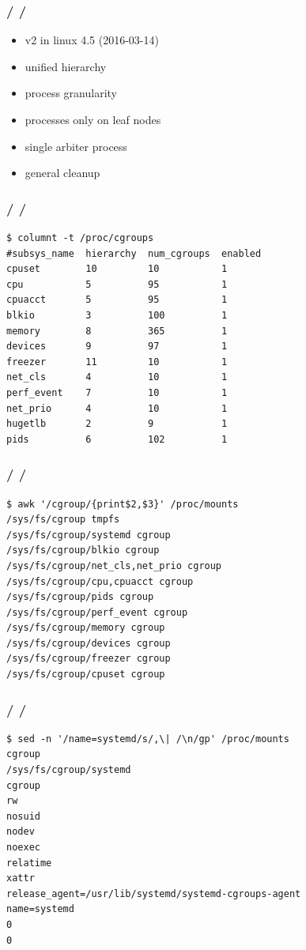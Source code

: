 \documentclass{beamer}
\newcommand{\autotitle}
{\frametitle{
    \secname
    \ifx\insertsubsection\empty
    \else
        /\subsecname
        \ifx\insertsubsubsection\empty\else/\subsubsecname\fi
    \fi}}
\begin{document}
\begin{frame}
    \autotitle
    \begin{itemize}
        \item v2 in linux 4.5 (2016-03-14)
        \item unified hierarchy
        \item process granularity
        \item processes only on leaf nodes
        \item single arbiter process
        \item general cleanup
    \end{itemize}
\end{frame}

\begin{frame}[fragile]
    \autotitle
        \begin{verbatim}
$ columnt -t /proc/cgroups
#subsys_name  hierarchy  num_cgroups  enabled
cpuset        10         10           1
cpu           5          95           1
cpuacct       5          95           1
blkio         3          100          1
memory        8          365          1
devices       9          97           1
freezer       11         10           1
net_cls       4          10           1
perf_event    7          10           1
net_prio      4          10           1
hugetlb       2          9            1
pids          6          102          1
    \end{verbatim}
\end{frame}

\begin{frame}[fragile]
    \autotitle
    \begin{verbatim}
$ awk '/cgroup/{print$2,$3}' /proc/mounts
/sys/fs/cgroup tmpfs
/sys/fs/cgroup/systemd cgroup
/sys/fs/cgroup/blkio cgroup
/sys/fs/cgroup/net_cls,net_prio cgroup
/sys/fs/cgroup/cpu,cpuacct cgroup
/sys/fs/cgroup/pids cgroup
/sys/fs/cgroup/perf_event cgroup
/sys/fs/cgroup/memory cgroup
/sys/fs/cgroup/devices cgroup
/sys/fs/cgroup/freezer cgroup
/sys/fs/cgroup/cpuset cgroup
    \end{verbatim}
\end{frame}

\begin{frame}[fragile]
    \autotitle
    \begin{verbatim}
$ sed -n '/name=systemd/s/,\| /\n/gp' /proc/mounts
cgroup
/sys/fs/cgroup/systemd
cgroup
rw
nosuid
nodev
noexec
relatime
xattr
release_agent=/usr/lib/systemd/systemd-cgroups-agent
name=systemd
0
0
    \end{verbatim}
\end{frame}
\end{document}
